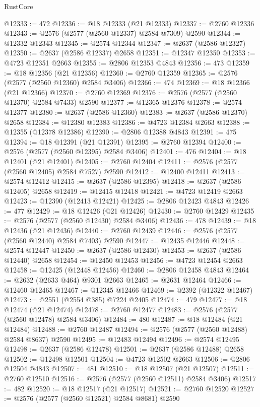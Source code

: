 \begin{lexlean}{RustCore}
\begin{coremodule}
@12333 := 472
@12336 := @18 @12333 (@21 @12333)
@12337 := @2760 @12336
@12343 := @2576 (@2577 (@2560 @12337) @2584 @7309) @2590
@12344 := @12332 @12343
@12345 := @2574 @12344
@12347 := @2637 (@2586 @12327)
@12350 := @2637 (@2586 @12337) @2658
@12351 := @12347 @12350
@12353 := @4723 @12351 @2663
@12355 := @2806 @12353 @4843
@12356 := 473
@12359 := @18 @12356 (@21 @12356)
@12360 := @2760 @12359
@12365 := @2576 (@2577 (@2560 @12360) @2584 @3406)
@12366 := 474
@12369 := @18 @12366 (@21 @12366)
@12370 := @2760 @12369
@12376 := @2576 (@2577 (@2560 @12370) @2584 @7433) @2590
@12377 := @12365 @12376
@12378 := @2574 @12377
@12380 := @2637 (@2586 @12360)
@12383 := @2637 (@2586 @12370) @2658
@12384 := @12380 @12383
@12386 := @4723 @12384 @2663
@12388 := @12355 (@12378 @12386)
@12390 := @2806 @12388 @4843
@12391 := 475
@12394 := @18 @12391 (@21 @12391)
@12395 := @2760 @12394
@12400 := @2576 (@2577 (@2560 @12395) @2584 @3406)
@12401 := 476
@12404 := @18 @12401 (@21 @12401)
@12405 := @2760 @12404
@12411 := @2576 (@2577 (@2560 @12405) @2584 @7527) @2590
@12412 := @12400 @12411
@12413 := @2574 @12412
@12415 := @2637 (@2586 @12395)
@12418 := @2637 (@2586 @12405) @2658
@12419 := @12415 @12418
@12421 := @4723 @12419 @2663
@12423 := @12390 (@12413 @12421)
@12425 := @2806 @12423 @4843
@12426 := 477
@12429 := @18 @12426 (@21 @12426)
@12430 := @2760 @12429
@12435 := @2576 (@2577 (@2560 @12430) @2584 @3406)
@12436 := 478
@12439 := @18 @12436 (@21 @12436)
@12440 := @2760 @12439
@12446 := @2576 (@2577 (@2560 @12440) @2584 @7403) @2590
@12447 := @12435 @12446
@12448 := @2574 @12447
@12450 := @2637 (@2586 @12430)
@12453 := @2637 (@2586 @12440) @2658
@12454 := @12450 @12453
@12456 := @4723 @12454 @2663
@12458 := @12425 (@12448 @12456)
@12460 := @2806 @12458 @4843
@12464 := @2632 (@2633 @464) @9301 @2663
@12465 := @2631 @12464
@12466 := @12460 @12465
@12467 := @12345 @12466
@12469 := @2392 (@12322 @12467)
@12473 := @2551 (@2554 @385) @7224 @2405
@12474 := 479
@12477 := @18 @12474 (@21 @12474)
@12478 := @2760 @12477
@12483 := @2576 (@2577 (@2560 @12478) @2584 @3406)
@12484 := 480
@12487 := @18 @12484 (@21 @12484)
@12488 := @2760 @12487
@12494 := @2576 (@2577 (@2560 @12488) @2584 @8637) @2590
@12495 := @12483 @12494
@12496 := @2574 @12495
@12498 := @2637 (@2586 @12478)
@12501 := @2637 (@2586 @12488) @2658
@12502 := @12498 @12501
@12504 := @4723 @12502 @2663
@12506 := @2806 @12504 @4843
@12507 := 481
@12510 := @18 @12507 (@21 @12507)
@12511 := @2760 @12510
@12516 := @2576 (@2577 (@2560 @12511) @2584 @3406)
@12517 := 482
@12520 := @18 @12517 (@21 @12517)
@12521 := @2760 @12520
@12527 := @2576 (@2577 (@2560 @12521) @2584 @8681) @2590

\end{coremodule}
\end{lexlean}

